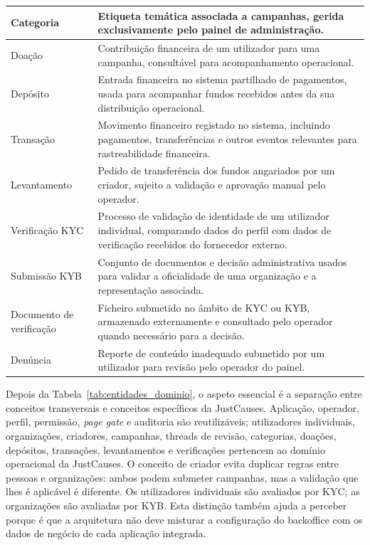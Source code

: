 \begin{table}[H]
\begin{center}
\begin{tabular}{|l|p{9cm}|}
Categoria         & Etiqueta temática associada a campanhas, gerida exclusivamente pelo painel de administração. \\ \hline
Doação            & Contribuição financeira de um utilizador para uma campanha, consultável para acompanhamento operacional. \\ \hline
Depósito          & Entrada financeira no sistema partilhado de pagamentos, usada para acompanhar fundos recebidos antes da sua distribuição operacional. \\ \hline
Transação         & Movimento financeiro registado no sistema, incluindo pagamentos, transferências e outros eventos relevantes para rastreabilidade financeira. \\ \hline
Levantamento      & Pedido de transferência dos fundos angariados por um criador, sujeito a validação e aprovação manual pelo operador. \\ \hline
Verificação KYC   & Processo de validação de identidade de um utilizador individual, comparando dados do perfil com dados de verificação recebidos do fornecedor externo. \\ \hline
Submissão KYB     & Conjunto de documentos e decisão administrativa usados para validar a oficialidade de uma organização e a representação associada. \\ \hline
Documento de verificação & Ficheiro submetido no âmbito de \gls{KYC} ou \gls{KYB}, armazenado externamente e consultado pelo operador quando necessário para a decisão. \\ \hline
Denúncia          & Reporte de conteúdo inadequado submetido por um utilizador para revisão pelo operador do painel. \\ \hline
\end{tabular}
\end{center}
\end{table}

Depois da Tabela~\ref{tab:entidades_dominio}, o aspeto essencial é a separação entre conceitos transversais e conceitos específicos da JustCauses. Aplicação, operador, perfil, permissão, \textit{page gate} e auditoria são reutilizáveis; utilizadores individuais, organizações, criadores, campanhas, threads de revisão, categorias, doações, depósitos, transações, levantamentos e verificações pertencem ao domínio operacional da JustCauses. O conceito de criador evita duplicar regras entre pessoas e organizações: ambos podem submeter campanhas, mas a validação que lhes é aplicável é diferente. Os utilizadores individuais são avaliados por \gls{KYC}; as organizações são avaliadas por \gls{KYB}. Esta distinção também ajuda a perceber porque é que a arquitetura não deve misturar a configuração do backoffice com os dados de negócio de cada aplicação integrada.


